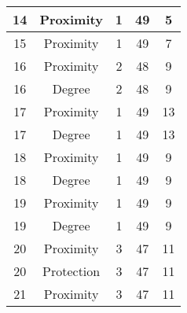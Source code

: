 \documentclass[results.tex]{subfiles}
\begin{document}
\begin{center}
\begin{tabular}{| c || c | c | c | c |}
            \hline
            14                      & Proximity                    & 1                      & 49                      & 5                    \\
            \hline
            15                      & Proximity                    & 1                      & 49                      & 7                    \\
            \hline
            16                      & Proximity                    & 2                      & 48                      & 9                    \\
            \hline
            16                      & Degree                       & 2                      & 48                      & 9                    \\
            \hline
            17                      & Proximity                    & 1                      & 49                      & 13                   \\
            \hline
            17                      & Degree                       & 1                      & 49                      & 13                   \\
            \hline
            18                      & Proximity                    & 1                      & 49                      & 9                    \\
            \hline
            18                      & Degree                       & 1                      & 49                      & 9                    \\
            \hline
            19                      & Proximity                    & 1                      & 49                      & 9                    \\
            \hline
            19                      & Degree                       & 1                      & 49                      & 9                    \\
            \hline
            20                      & Proximity                    & 3                      & 47                      & 11                   \\
            \hline
            20                      & Protection                   & 3                      & 47                      & 11                   \\
            \hline
            21                      & Proximity                    & 3                      & 47                      & 11                   \\

\end{tabular}
\end{center}
\end{document}
